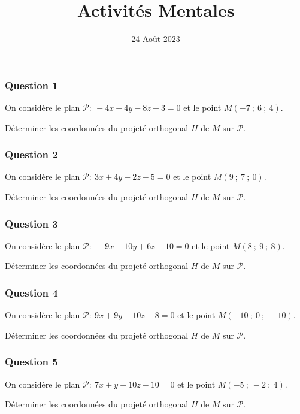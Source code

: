 \documentclass[15pt, mathserif]{beamer}
\title{Activités Mentales}
\date{24 Août 2023}
\begin{document}
\begin{frame}
    \titlepage
\end{frame}

\begin{frame} 
	\frametitle{Question 1}
On considère le plan $\mathcal{P}:~ -4x-4y-8z-3= 0$ et le point $M (-7~;~6~;~4)$.

\medskip

	Déterminer les coordonnées du projeté orthogonal $H$ de $M$ sur $\mathcal{P}$.\end{frame}


\begin{frame} 
	\frametitle{Question 2}
On considère le plan $\mathcal{P}:~ 3x+4y-2z-5= 0$ et le point $M (9~;~7~;~0)$.

\medskip

	Déterminer les coordonnées du projeté orthogonal $H$ de $M$ sur $\mathcal{P}$.\end{frame}


\begin{frame} 
	\frametitle{Question 3}
On considère le plan $\mathcal{P}:~ -9x-10y+6z-10= 0$ et le point $M (8~;~9~;~8)$.

\medskip

	Déterminer les coordonnées du projeté orthogonal $H$ de $M$ sur $\mathcal{P}$.\end{frame}


\begin{frame} 
	\frametitle{Question 4}
On considère le plan $\mathcal{P}:~ 9x+9y-10z-8= 0$ et le point $M (-10~;~0~;~-10)$.

\medskip

	Déterminer les coordonnées du projeté orthogonal $H$ de $M$ sur $\mathcal{P}$.\end{frame}


\begin{frame} 
	\frametitle{Question 5}
On considère le plan $\mathcal{P}:~ 7x+y-10z-10= 0$ et le point $M (-5~;~-2~;~4)$.

\medskip

	Déterminer les coordonnées du projeté orthogonal $H$ de $M$ sur $\mathcal{P}$.\end{frame}
\end{document}
